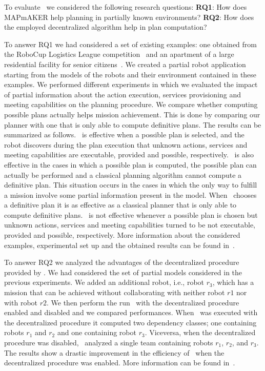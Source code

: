 To evaluate  \toolName\ we considered the following research questions: \textbf{RQ1}: How does MAPmAKER help planning in partially known environments? \textbf{RQ2}: How does the employed decentralized algorithm help in plan computation?

To answer RQ1 we  had considered a set of existing examples:
one obtained from the RoboCup Logistics League competition~\cite{karrasrobocup} and an apartment of a large residential facility for senior citizens~\cite{map}.
We created a partial robot application starting from the models of the robots and their environment contained in these examples.
We performed different experiments in which we evaluated the impact of partial information about the action execution, services provisioning and meeting capabilities on the planning procedure.
We compare whether computing possible plans actually helps mission achievement.
This is done by comparing our planner with one that is only able to compute definitive plans.
The results can be summarized as follows.
\toolName\ is effective when  a possible plan is selected, and the robot discovers during the plan execution 
that unknown actions, services and meeting capabilities are executable, provided and possible, respectively.
\toolName\ is also effective in the cases in which a possible plan  is computed, the possible plan can actually be performed and a classical planning algorithm cannot compute a definitive plan.
This situation occurs in the cases in which the only way to fulfill a mission involve some partial information present in the model.
When \toolName\ chooses a definitive plan it is as effective as a classical planner that is only able to compute definitive plans.
\toolName\ is not effective whenever a possible plan is chosen but  unknown actions, services and meeting capabilities turned to be not executable, provided and possible, respectively.
More information about the considered examples, experimental set up and the obtained results can be found in~\cite{mapmaker17}.

To answer RQ2 we analyzed the advantages of the decentralized procedure provided by \toolName.
We had considered the set of partial models considered in the previous experiments. 
We added an additional robot, i.e., robot $r_3$, which has a mission that can be achieved without collaborating with neither  robot $r1$ nor with robot $r2$. 
We then perform the run \toolName\ with the decentralized procedure enabled and disabled and we compared performances. 
When \toolName\ was executed with the  decentralized procedure it computed two dependency classes; one containing robots $r_1$ and $r_2$ and one containing robot $r_3$. 
Viceversa, when the decentralized procedure was disabled, \toolName\ 
analyzed a single team containing  robots $r_1$, $r_2$, and $r_3$. 
The results show a drastic improvement in the efficiency of \toolName\ when the decentralized procedure was enabled.
More information can be found in~\cite{mapmaker17}.

